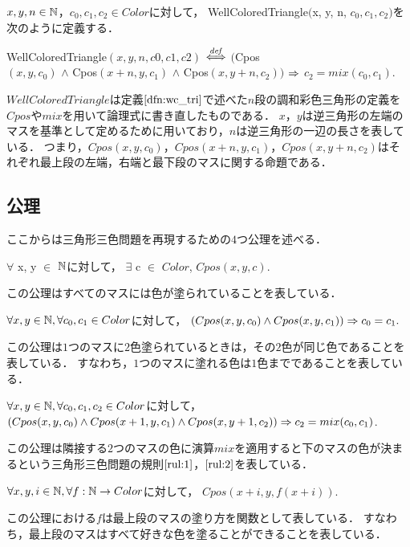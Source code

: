 \begin{dfn}[$WellColoredTriangle$]
  $x, y, n \in \mathbb{N}$，$c_0, c_1, c_2 \in Color$に対して，
  WellColoredTriangle$($x, y, n, $c_0, c_1, c_2)$を次のように定義する．
  
  WellColoredTriangle$(x, y, n, c0, c1, c2)$ $\overset{{\it def}}{\Longleftrightarrow}$
  $($Cpos \\ $(x,y,c_0)$ $\land$ Cpos$(x+n,y,c_1)$ $\land$ Cpos$(x,y+n,c_2))$ $\Rightarrow$ $c_2 = mix(c_0,c_1)$.
  
  $WellColoredTriangle$は定義$\ref{dfn:wc_tri}$で述べた$n$段の調和彩色三角形の定義を$Cpos$や$mix$を用いて論理式に書き直したものである．
  $x$，$y$は逆三角形の左端のマスを基準として定めるために用いており，$n$は逆三角形の一辺の長さを表している．
  つまり，$Cpos(x,y,c_0)$，$Cpos(x+n,y,c_1)$，$Cpos(x,y+n,c_2)$はそれぞれ最上段の左端，右端と最下段のマスに関する命題である．
\end{dfn}

\subsection{公理}
ここからは三角形三色問題を再現するための$4$つ公理を述べる．
\begin{axm}[$C\_exists$] \label{axm:exists}
  $\forall$ x, y $\in$ $\mathbb{N}$に対して，
  $\exists$ c $\in$ $Color$, $Cpos(x,y,c)$.
  
  この公理はすべてのマスには色が塗られていることを表している．
\end{axm}
\begin{axm}[$C\_uniq$] \label{axm:uniq}
  $\forall x, y \in \mathbb{N}, \forall c_0, c_1 \in Color$に対して，
  $(Cpos(x,y,c_0) \land Cpos(x,y,c_1)) \Rightarrow c_0 = c_1.$
  
  この公理は$1$つのマスに$2$色塗られているときは，その$2$色が同じ色であることを表している．
  すなわち，$1$つのマスに塗れる色は$1$色までであることを表している．
\end{axm}
\begin{axm}[$C\_mix$] \label{axm:mix}
  $\forall x, y \in \mathbb{N}, \forall c_0, c_1, c_2 \in Color$に対して，
  $(Cpos(x,y,c_0) \land Cpos(x+1,y,c_1) \land Cpos(x,y+1,c_2)) \Rightarrow c_2 = mix(c_0,c_1)$.
  
  この公理は隣接する$2$つのマスの色に演算$mix$を適用すると下のマスの色が決まるという三角形三色問題の規則$\ref{rul:1}$，$\ref{rul:2}$を表している．
\end{axm}
\begin{axm}[$C\_mix$] \label{axm:mix}
  $\forall x, y, i \in \mathbb{N}, \forall f:\mathbb{N} \to Color$に対して，
  $Cpos(x+i,y,f(x+i))$.
  
  この公理における$f$は最上段のマスの塗り方を関数として表している．
  すなわち，最上段のマスはすべて好きな色を塗ることができることを表している．
\end{axm}

